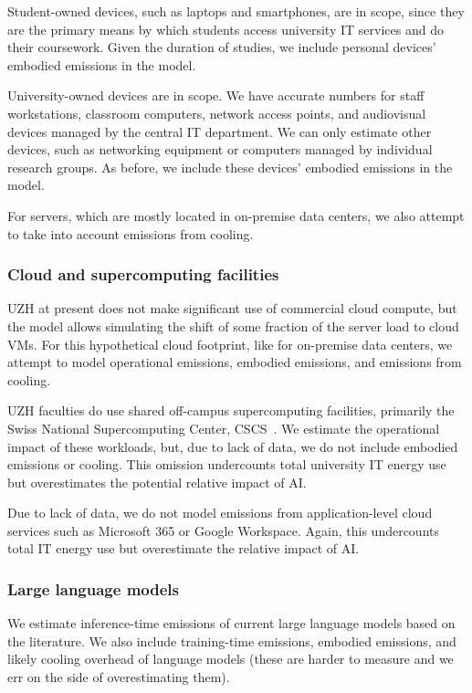 \documentclass[11pt]{article}
\begin{document}
Student-owned devices, such as laptops and smartphones, are in scope, since they are the primary means by which students access university IT services and do their coursework. Given the duration of studies, we include personal devices' embodied emissions in the model.

University-owned devices are in scope. We have accurate numbers for staff workstations, classroom computers, network access points, and audiovisual devices managed by the central IT department. We can only estimate other devices, such as networking equipment or computers managed by individual research groups. As before, we include these devices' embodied emissions in the model.

For servers, which are mostly located in on-premise data centers, we also attempt to take into account emissions from cooling.

\subsubsection*{Cloud and supercomputing facilities}

UZH at present does not make significant use of commercial cloud compute, but the model allows simulating the shift of some fraction of the server load to cloud VMs. For this hypothetical cloud footprint, like for on-premise data centers, we attempt to model operational emissions, embodied emissions, and emissions from cooling.

UZH faculties do use shared off-campus supercomputing facilities, primarily the Swiss National Supercomputing Center, CSCS~\cite{cscs}. We estimate the operational impact of these workloads, but, due to lack of data, we do not include embodied emissions or cooling. This omission undercounts total university IT energy use but overestimates the potential relative impact of AI.

Due to lack of data, we do not model emissions from application-level cloud services such as Microsoft 365 or Google Workspace. Again, this undercounts total IT energy use but overestimate the relative impact of AI.

\subsubsection*{Large language models}

We estimate inference-time emissions of current large language models based on the literature. We also include training-time emissions, embodied emissions, and likely cooling overhead of language models (these are harder to measure and we err on the side of overestimating them).
\end{document}
